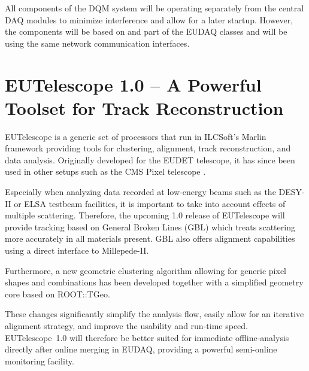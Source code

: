\documentclass[paper=a4, fontsize=11pt, titlepage]{scrartcl}	%
\numberwithin{equation}{section}		%
\numberwithin{figure}{section}			%
\numberwithin{table}{section}           	%
\begin{document}
All components of the DQM system will be operating separately from the
central DAQ modules to minimize interference and allow for a later
startup. However, the components will be based on and part of the
EUDAQ classes and will be using the same network communication interfaces.


\section{EUTelescope 1.0 -- A Powerful Toolset for Track Reconstruction }
\label{sec:analysis}

EUTelescope is a generic set of processors that run in ILCSoft's Marlin
framework providing tools for clustering, alignment, track
reconstruction, and data analysis. Originally developed for the EUDET
telescope, it has since been used in other setups such as
the CMS Pixel telescope \cite{spannagel2012}.

Especially when analyzing data recorded at low-energy beams such as
the DESY-II or ELSA testbeam facilities, it is important to take into
account effects of multiple scattering. Therefore, the upcoming 1.0
release of EUTelescope will provide tracking based on {General Broken
  Lines (GBL)} \cite{Kleinwort:2012np} which treats scattering more
accurately in all materials present.  GBL also offers alignment
capabilities using a direct interface to {Millepede-II}.

Furthermore, a new {geometric clustering algorithm} allowing for generic
pixel shapes and combinations has been developed together with a
simplified geometry core based on ROOT::TGeo.

These changes significantly simplify the analysis flow, easily allow for
an iterative alignment strategy, and improve the usability and
run-time speed. EUTelescope~1.0 will therefore be better suited for
immediate offline-analysis directly after online merging in EUDAQ,
providing a powerful semi-online monitoring facility.
\end{document}

